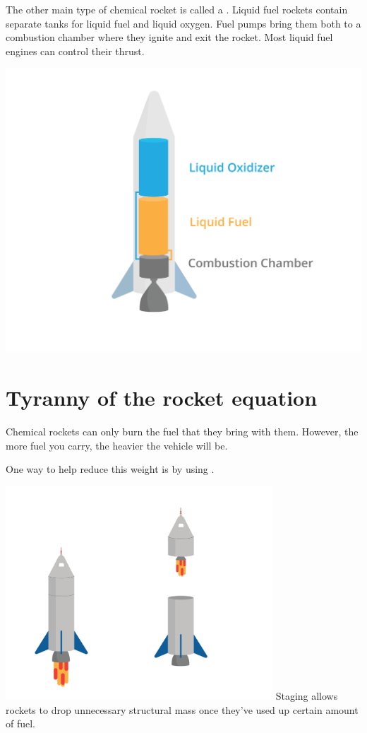 The other main type of chemical rocket is called a . Liquid fuel rockets contain separate tanks for liquid fuel and liquid oxygen. Fuel pumps bring them both to a combustion chamber where they ignite and exit the rocket. Most liquid fuel engines can control their thrust. 


\includegraphics[width=1\textwidth]{liquid.png}


\section{Tyranny of the rocket equation}
	Chemical rockets can only burn the fuel that they bring with them. However, the more fuel you carry, the heavier the vehicle will be.

 

	One way to help reduce this weight is by using . 

\includegraphics[width=0.75\textwidth]{stagingDual.png}
	Staging allows rockets to drop unnecessary structural mass once they've used up certain amount of fuel. 



